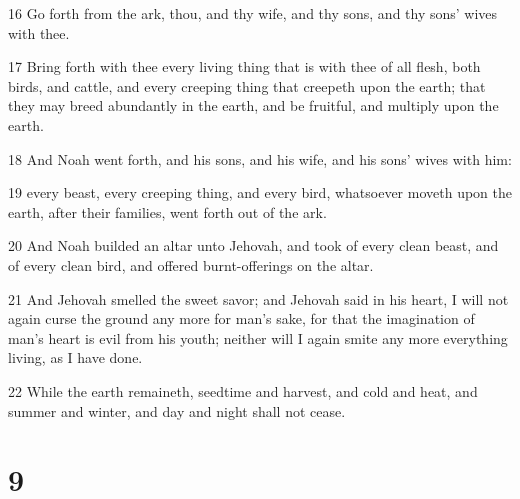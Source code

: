 \par 16 Go forth from the ark, thou, and thy wife, and thy sons, and thy sons' wives with thee.
\par 17 Bring forth with thee every living thing that is with thee of all flesh, both birds, and cattle, and every creeping thing that creepeth upon the earth; that they may breed abundantly in the earth, and be fruitful, and multiply upon the earth.
\par 18 And Noah went forth, and his sons, and his wife, and his sons' wives with him:
\par 19 every beast, every creeping thing, and every bird, whatsoever moveth upon the earth, after their families, went forth out of the ark.
\par 20 And Noah builded an altar unto Jehovah, and took of every clean beast, and of every clean bird, and offered burnt-offerings on the altar.
\par 21 And Jehovah smelled the sweet savor; and Jehovah said in his heart, I will not again curse the ground any more for man's sake, for that the imagination of man's heart is evil from his youth; neither will I again smite any more everything living, as I have done.
\par 22 While the earth remaineth, seedtime and harvest, and cold and heat, and summer and winter, and day and night shall not cease.

\chapter{9}

